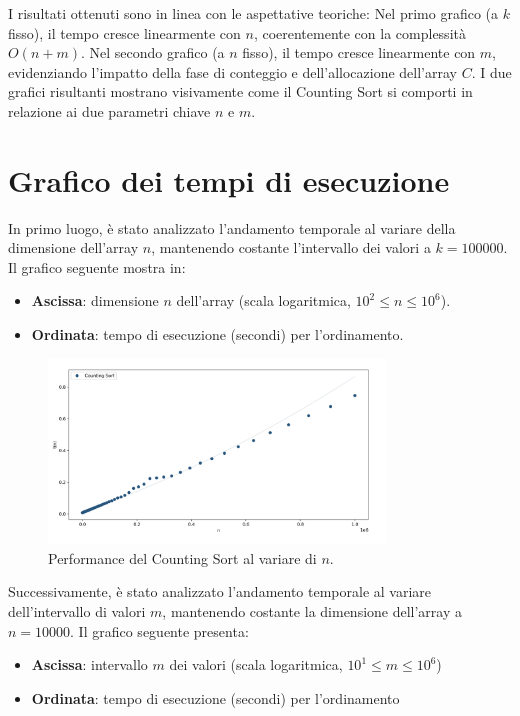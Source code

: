 \documentclass[a4paper, 12pt, oneside]{book}
\begin{document}
\noindent I risultati ottenuti sono in linea con le aspettative teoriche:
Nel primo grafico (a \(k\) fisso), il tempo cresce linearmente con \(n\), coerentemente con la complessità \(O(n + m)\).
Nel secondo grafico (a \(n\) fisso), il tempo cresce linearmente con \(m\), evidenziando l'impatto della fase di conteggio e dell'allocazione dell'array \(C\).
I due grafici risultanti mostrano visivamente come il Counting Sort si comporti in relazione ai due parametri chiave \(n\) e \(m\).

\section{Grafico dei tempi di esecuzione}

In primo luogo, è stato analizzato l'andamento temporale al variare della dimensione dell'array \(n\), mantenendo costante l'intervallo dei valori a \(k = 100000\). 
Il grafico seguente mostra in:
\begin{itemize}
    \item \textbf{Ascissa}: dimensione \(n\) dell'array (scala logaritmica, \(10^2 \leq n \leq 10^6\)).
    \item \textbf{Ordinata}: tempo di esecuzione (secondi) per l'ordinamento.
\end{itemize}

\begin{figure}[H]
    \centering
    \includegraphics[width=0.8\textwidth]{images/grafico_counting_sort_n.png}
    \caption{Performance del Counting Sort al variare di \(n\).}
    \label{fig:counting_sort_n}
\end{figure}

\noindent Successivamente, è stato analizzato l'andamento temporale al variare dell'intervallo di valori \(m\), mantenendo costante la dimensione dell'array a \(n = 10000\). 
Il grafico seguente presenta:
\begin{itemize}
    \item \textbf{Ascissa}: intervallo \(m\) dei valori (scala logaritmica, \(10^1 \leq m \leq 10^6\))
    \item \textbf{Ordinata}: tempo di esecuzione (secondi) per l'ordinamento
\end{itemize}
\end{document}
